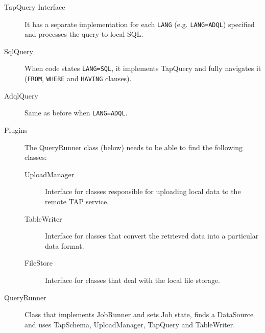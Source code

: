 \begin{description}
	\item[TapQuery Interface] It has a separate implementation for each \texttt{LANG} (e.g. \texttt{LANG=ADQL}) specified and processes the query to local SQL.
	\item[SqlQuery] When code states \texttt{LANG=SQL}, it implements TapQuery and fully navigates it (\texttt{FROM}, \texttt{WHERE} and \texttt{HAVING} clauses).
	
	\item[AdqlQuery] Same as before when \texttt{LANG=ADQL}.
	
	
	\item[Plugins] The QueryRunner class (below) needs to be able to find the following classes:

	\begin{description}
	\item[UploadManager] Interface for classes responsible for uploading local data to the remote TAP service.
	\item[TableWriter] Interface for classes that convert the retrieved data into a particular data format.
	\item[FileStore] Interface for classes that deal with the local file storage.
	\end{description}
	
	\item[QueryRunner] Class that implements JobRunner and sets Job state, finds a DataSource and uses TapSchema, UploadManager, TapQuery and TableWriter.
	
\end{description}







